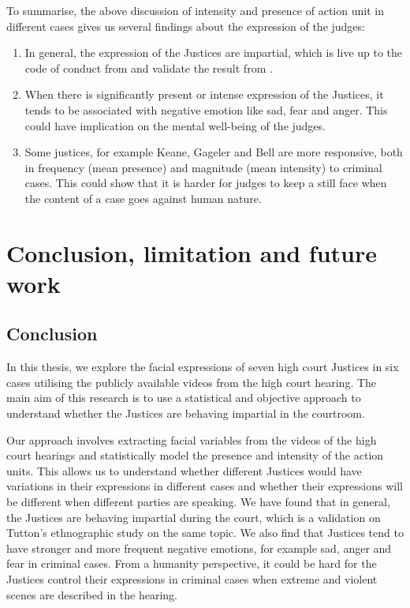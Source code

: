 \documentclass{monashthesis}
\begin{document}
To summarise, the above discussion of intensity and presence of action unit in different cases gives us several findings about the expression of the judges:

\begin{enumerate}
\def\labelenumi{\arabic{enumi})}
\item
  In general, the expression of the Justices are impartial, which is live up to the code of conduct from \textcite{judicalguid} and validate the result from \textcite{tutton2018judicial}.
\item
  When there is significantly present or intense expression of the Justices, it tends to be associated with negative emotion like sad, fear and anger. This could have implication on the mental well-being of the judges.
\item
  Some justices, for example Keane, Gageler and Bell are more responsive, both in frequency (mean presence) and magnitude (mean intensity) to criminal cases. This could show that it is harder for judges to keep a still face when the content of a case goes against human nature.
\end{enumerate}

\hypertarget{conclusion-limitation-and-future-work}{%
\chapter{Conclusion, limitation and future work}\label{conclusion-limitation-and-future-work}}

\hypertarget{conclusion}{%
\section{Conclusion}\label{conclusion}}

In this thesis, we explore the facial expressions of seven high court Justices in six cases utilising the publicly available videos from the high court hearing. The main aim of this research is to use a statistical and objective approach to understand whether the Justices are behaving impartial in the courtroom.

Our approach involves extracting facial variables from the videos of the high court hearings and statistically model the presence and intensity of the action units. This allows us to understand whether different Justices would have variations in their expressions in different cases and whether their expressions will be different when different parties are speaking. We have found that in general, the Justices are behaving impartial during the court, which is a validation on Tutton's ethnographic study on the same topic. We also find that Justices tend to have stronger and more frequent negative emotions, for example sad, anger and fear in criminal cases. From a humanity perspective, it could be hard for the Justices control their expressions in criminal cases when extreme and violent scenes are described in the hearing.
\end{document}
